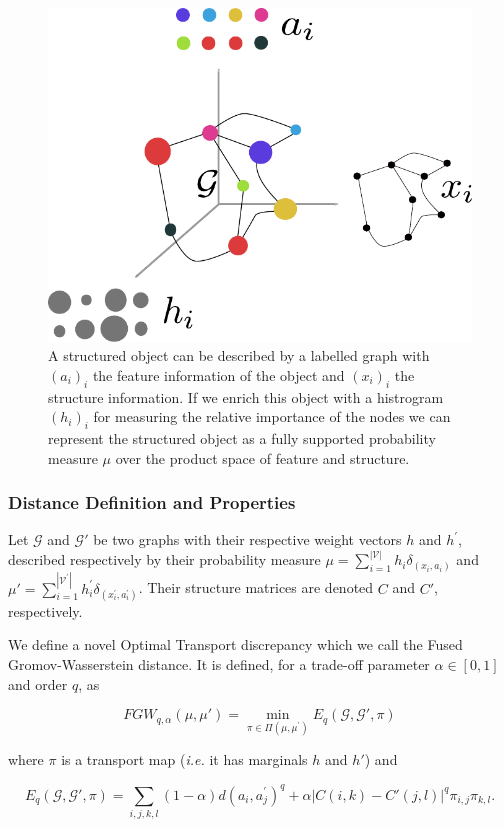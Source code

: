 \begin{figure}
\centering
\includegraphics[width=.4\textwidth]{fig/graph_as_distrib}
\caption{A structured object can be described by a labelled graph with $(a_{i})_{i}$ the feature information of the object and $(x_{i})_{i}$ the structure information.
If we enrich this object with a histrogram $(h_{i})_{i}$ for measuring the relative importance of the nodes we can represent the structured object as a fully supported probability measure $\mu$ over the product space of feature and structure. \label{fig:graph}}
\end{figure}

\subsubsection{Distance Definition and Properties}

Let $\mathcal{G}$ and $\mathcal{G}'$ be two graphs with their respective weight
vectors $h$ and $h^\prime$, described respectively
by their probability measure $\mu= \sum_{i=1}^{|\mathcal{V}|} h_{i} \delta_{(x_{i},a_{i})}$
and $\mu' = \sum_{i=1}^{|\mathcal{V}^\prime|} h^\prime_i \delta_{(x^\prime_i,a^\prime_i)}$.
Their structure matrices are denoted $C$ and $C'$, respectively.


We define a novel Optimal Transport discrepancy which we call the
Fused Gromov-Wasserstein distance.
It is defined, for a trade-off parameter  $\alpha \in [0,1]$ and order $q$, as

\begin{equation}
\label{discretefgw}
FGW_{q, \alpha} (\mu, \mu') = \min_{\pi \in \Pi(\mu, \mu^\prime)}
    E_{q}(\mathcal{G}, \mathcal{G}', \pi)
\end{equation}

where $\pi$ is a transport map (\emph{i.e.} it has marginals $h$ and $h'$) and

\begin{equation}
E_{q}(\mathcal{G}, \mathcal{G}', \pi) =
    \sum_{i,j,k,l} (1-\alpha) d(a_{i},a^\prime_j)^{q}
                    +\alpha |C(i,k)-C'(j,l)|^{q} \pi_{i,j}\pi_{k,l} .
\end{equation}

